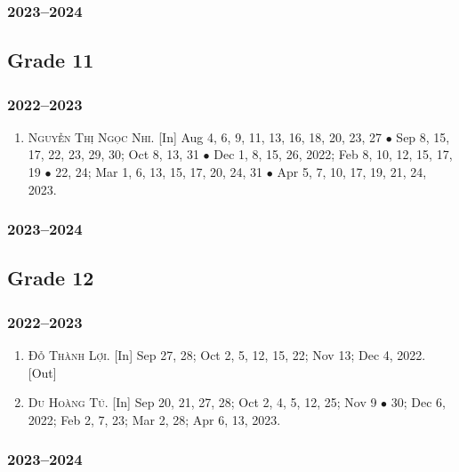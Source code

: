 \documentclass{article}
\begin{document}
\subsubsection{2023--2024}

\subsection{Grade 11}

\subsubsection{2022--2023}

\begin{enumerate}
	\item \textsc{Nguyễn Thị Ngọc Nhi.} \textsf{[In]} Aug 4, 6, 9, 11, 13, 16, 18, 20, 23, 27 $\bullet$ Sep 8, 15, 17, 22, 23, 29, 30; Oct 8, 13, 31 $\bullet$ Dec 1, 8,  15, 26, 2022; Feb 8, 10, 12, 15, 17, 19 $\bullet$ 22, 24; Mar 1, 6, 13, 15, 17, 20, 24, 31 $\bullet$ Apr 5, 7, 10, 17, 19, 21, 24, 2023.
\end{enumerate}

\subsubsection{2023--2024}

\subsection{Grade 12}

\subsubsection{2022--2023}

\begin{enumerate}
	\item \textsc{Đỗ Thành Lợi.} \textsf{[In]} Sep 27, 28; Oct 2, 5, 12, 15, 22; Nov 13; Dec 4, 2022. \textsf{[Out]}
	\item \textsc{Du Hoàng Tú.} \textsf{[In]} Sep 20, 21, 27, 28; Oct 2, 4, 5, 12, 25; Nov 9 $\bullet$ 30; Dec 6, 2022; Feb 2, 7, 23; Mar 2, 28; Apr 6, 13, 2023.
\end{enumerate}

\subsubsection{2023--2024}

\end{document}
